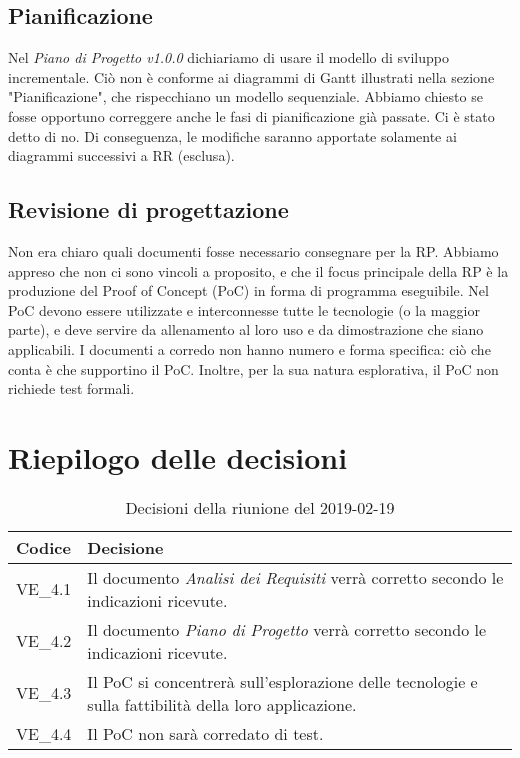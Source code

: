 \begin{itemize}
\end{itemize}

\subsection{Pianificazione}
Nel \textit{Piano di Progetto v1.0.0} dichiariamo di usare il modello di sviluppo incrementale. Ciò non è conforme ai diagrammi di Gantt illustrati nella sezione "Pianificazione", che rispecchiano un modello sequenziale. Abbiamo chiesto se fosse opportuno correggere anche le fasi di pianificazione già passate. Ci è stato detto di no. Di conseguenza, le modifiche saranno apportate solamente ai diagrammi successivi a RR (esclusa).

\subsection{Revisione di progettazione}
Non era chiaro quali documenti fosse necessario consegnare per la RP. Abbiamo appreso che non ci sono vincoli a proposito, e che il focus principale della RP è la produzione del Proof of Concept (PoC) in forma di programma eseguibile. Nel PoC devono essere utilizzate e interconnesse tutte le tecnologie (o la maggior parte), e deve servire da allenamento al loro uso e da dimostrazione che siano applicabili. I documenti a corredo non hanno numero e forma specifica: ciò che conta è che supportino il PoC.
Inoltre, per la sua natura esplorativa, il PoC non richiede test formali.


\pagebreak

\section{Riepilogo delle decisioni}

	
	\begin{longtable}{ >{\centering}p{} >{}p{}}
		\caption{Decisioni della riunione del 2019-02-19}\\	
		\rowcolorhead
		\textbf{\color{white}Codice} 
		& \centering\textbf{\color{white}Decisione} 
		\tabularnewline 
		\endfirsthead
		VE\_4.1 & Il documento \textit{Analisi dei Requisiti} verrà corretto secondo le indicazioni ricevute.
		
		\tabularnewline 
		VE\_4.2 & Il documento \textit{Piano di Progetto} verrà corretto secondo le indicazioni ricevute.
	
		\tabularnewline 
		VE\_4.3 & Il PoC si concentrerà sull'esplorazione delle tecnologie e sulla fattibilità della loro applicazione.
	
		\tabularnewline 
		VE\_4.4 & Il PoC non sarà corredato di test.

	\end{longtable}

